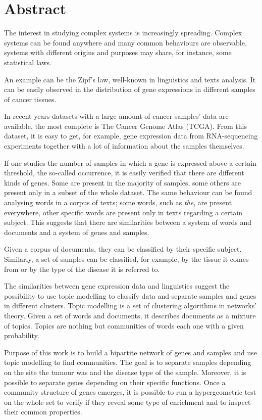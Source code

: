 \chapter*{Abstract}
The interest in studying complex systems is increasingly spreading.
Complex systems can be found anywhere and many common behaviours are
observable, systems with different origins and purposes may share, for
instance, some statistical laws.

An example can be the Zipf's law, well-known in linguistics and texts
analysis. It can be easily observed in the distribution of gene expressions
in different samples of cancer tissues.

In recent years datasets with a large amount of cancer samples' data are
available, the most complete is The Cancer Genome Atlas (TCGA). From
this dataset, it is easy to get, for example, gene expression data from
RNA-sequencing experiments together with a lot of information about the
samples themselves.

If one studies the number of samples in which a gene is expressed above
a certain threshold, the so-called occurrence, it is easily verified
that there are different kinds of genes. Some are present in the
majority of samples, some others are present only in a subset of the
whole dataset. The same behaviour can be found analysing words in
a corpus of texts; some words, such as \emph{the}, are present everywhere,
other specific words are present only in texts regarding a certain
subject. This suggests that there are similarities between a system of
words and documents and a system of genes and samples.

Given a corpus of documents, they can be classified by their specific
subject. Similarly, a set of samples can be classified, for
example, by the tissue it comes from or by the type of the disease it is
referred to.

The similarities between gene expression data and linguistics suggest
the possibility to use topic modelling to classify data and separate
samples and genes in different clusters. Topic modelling is a set of
clustering algorithms in networks' theory. Given a set of words and
documents, it describes documents as a mixture of topics. Topics are
nothing but communities of words each one with a given probability.

Purpose of this work is to build a bipartite network of genes and
samples and use topic modelling to find communities. The goal is to
separate samples depending on the site the tumour was and the disease
type of the sample. Moreover, it is possible to separate genes depending
on their specific functions. Once a community structure of genes
emerges, it is possible to run a hypergeometric test on the whole set to verify if they reveal some type of enrichment and to inspect
their common properties.

